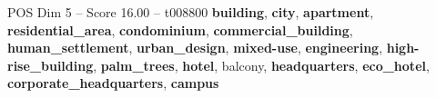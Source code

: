 \begin{textsample}{POS Dim 5 – Score 16.00 – t008800}  \label{ex:f5_pos_031}
\textbf{building}, \textbf{city}, \textbf{apartment}, \textbf{residential\_area}, \textbf{condominium}, \textbf{commercial\_building}, \textbf{human\_settlement}, \textbf{urban\_design}, \textbf{mixed-use}, \textbf{engineering}, \textbf{high-rise\_building}, \textbf{palm\_trees}, \textbf{hotel}, balcony, \textbf{headquarters}, \textbf{eco\_hotel}, \textbf{corporate\_headquarters}, \textbf{campus}

\end{textsample}
